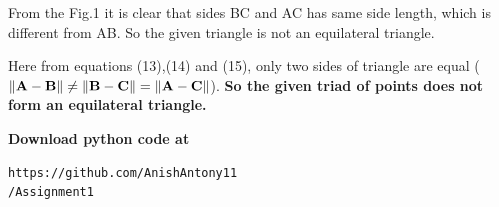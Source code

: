 \documentclass[journal,12pt,twocolumn]{IEEEtran}
\begin{document}
\vspace{0.5cm}

From the Fig.1 it is clear that sides BC and AC has same side length, which is different from AB. So the given triangle is not an equilateral triangle.


\vspace{0.5cm}
Here from equations (13),(14) and (15), only two sides of triangle are equal ($\left\lVert \mathbf{A} - \mathbf{B}\right\rVert \neq \left\lVert \mathbf{B} - \mathbf{C}\right\rVert  = \left\lVert \mathbf{A} - \mathbf{C}\right\rVert $).
\textbf{So the given triad of points does not form an equilateral triangle.}

\vspace{0.4cm}

\textbf{Download python code at }
\begin{lstlisting}[frame=single] 
https://github.com/AnishAntony11
/Assignment1
\end{lstlisting}
\end{document}

